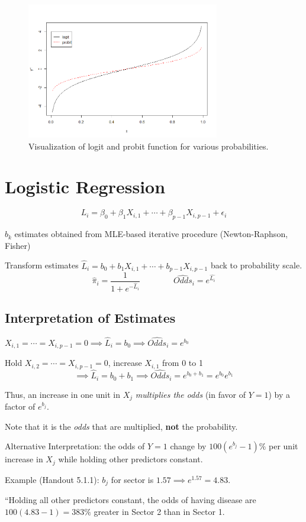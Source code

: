 \documentclass[12pt]{notes}
\begin{document}
\begin{figure}[H]
\centering
\includegraphics[width = 0.75\textwidth]{figures/module5/logit_probit.png}
\caption{Visualization of logit and probit function for various probabilities.}
\end{figure}

\section{Logistic Regression}

$$L_i = \beta_0 + \beta_1X_{i, 1} + \cdots + \beta_{p-1}X_{i, p-1} + \epsilon_i$$

\bi
\item $b_k$ estimates obtained from MLE-based iterative procedure (Newton-Raphson, Fisher)
\item Transform estimates $\hat{L}_i = b_0 + b_1X_{i, 1} + \cdots + b_{p-1}X_{i, p-1}$ back to probability scale. 
$$\hat{\pi}_i = \frac{1}{1+e^{-\hat{L}_i}} \qquad \qquad \hat{Odds}_i = e^{\hat{L_i}}$$
\ei

\subsection{Interpretation of Estimates}
\bi
\item $X_{i, 1} = \cdots = X_{i, p-1} = 0 \implies \hat{L}_i = b_0 \implies \hat{Odds}_i = e^{b_0}$
\item Hold $X_{i, 2} = \cdots = X_{i, p-1} = 0$, increase $X_{i, 1}$ from 0 to 1
$$\implies \hat{L}_i = b_0+b_1 \implies \hat{Odds}_i = e^{b_0 + b_1} = e^{b_0}e^{b_1}$$
\item Thus, an increase in one unit in $X_j$ \textit{multiplies the odds} (in favor of $Y=1$) by a factor of $e^{b_j}.$
\bi
\item Note that it is the \textit{odds} that are multiplied, \textbf{not} the probability. 
\ei
\item Alternative Interpretation: the odds of $Y=1$ change by $100(e^{b_j} - 1)\%$ per unit increase in $X_j$ while holding other predictors constant. 
\bi
\item Example (Handout 5.1.1): $b_j$ for sector is $1.57 \implies e^{1.57} = 4.83.$ 
\item ``Holding all other predictors constant, the odds of having disease are $100(4.83-1) = 383\%$ greater in Sector 2 than in Sector 1. 
\ei
\ei
\end{document}
